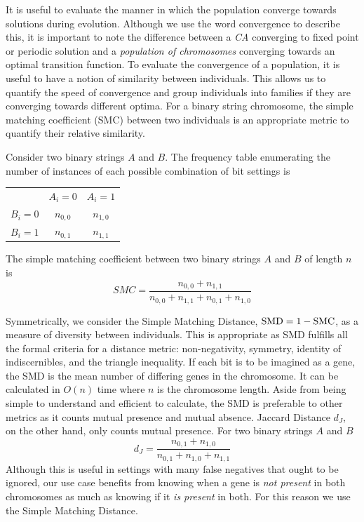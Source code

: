 It is useful to evaluate the manner in which the population converge towards solutions during evolution. Although we use the word convergence to describe this, it is important to note the difference between a \textit{CA} converging to fixed point or periodic solution and a \textit{population of chromosomes} converging towards an optimal transition function. To evaluate the convergence of a population, it is useful to have a notion of similarity between individuals. This allows us to quantify the speed of convergence and group individuals into families if they are converging towards different optima. For a binary string chromosome, the simple matching coefficient (SMC) between two individuals is an appropriate metric to quantify their relative similarity. 
\begin{definition} Consider two binary strings $A$ and $B$. The frequency table enumerating the number of instances of each possible combination of bit settings is
\begin{center}
    \begin{tabular}{ c c c }
              & $A_i = 0$ & $A_i = 1$ \\ 
        $B_i = 0$ & $n_{0,0}$ & $n_{1,0}$ \\  
        $B_i = 1$ & $n_{0,1}$ & $n_{1, 1}$    
    \end{tabular}
\end{center}
The simple matching coefficient between two binary strings $A$ and $B$ of length $n$ is\\
\[
    SMC = \frac{n_{0, 0} + n_{1, 1}}{n_{0, 0} + n_{1, 1} + n_{0, 1} + n_{1, 0}}
\]
    
\end{definition}
Symmetrically, we consider the Simple Matching Distance, $\textnormal{SMD} = 1 - \textnormal{SMC}$, as a measure of diversity between individuals. This is appropriate as SMD fulfills all the formal criteria for a distance metric: non-negativity, symmetry, identity of indiscernibles, and the triangle inequality. If each bit is to be imagined as a gene, the SMD is the mean number of differing genes in the chromosome. It can be calculated in $O(n)$ time where $n$ is the chromosome length. Aside from being simple to understand and efficient to calculate, the SMD is preferable to other metrics as it counts mutual presence and mutual absence. Jaccard Distance $d_J$, on the other hand, only counts mutual presence. For two binary strings $A$ and $B$
\[
    d_J = \frac{n_{0, 1} + n_{1, 0}}{n_{0, 1} + n_{1, 0} + n_{1, 1}}
\]
Although this is useful in settings with many false negatives that ought to be ignored, our use case benefits from knowing when a gene is \textit{not present} in both chromosomes as much as knowing if it \textit{is present} in both. For this reason we use the Simple Matching Distance.

